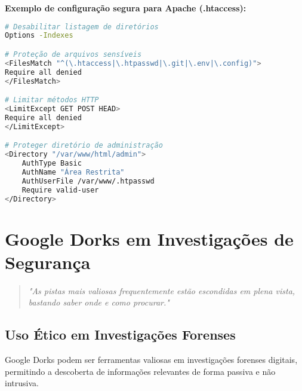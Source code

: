 \documentclass[12pt,a4paper]{book}
\begin{document}
\begin{examplebox}
\textbf{Exemplo de configuração segura para Apache (.htaccess):}

\begin{lstlisting}[language=bash]
# Desabilitar listagem de diretórios
Options -Indexes

# Proteção de arquivos sensíveis
<FilesMatch "^(\.htaccess|\.htpasswd|\.git|\.env|\.config)">
Require all denied
</FilesMatch>

# Limitar métodos HTTP
<LimitExcept GET POST HEAD>
Require all denied
</LimitExcept>

# Proteger diretório de administração
<Directory "/var/www/html/admin">
    AuthType Basic
    AuthName "Área Restrita"
    AuthUserFile /var/www/.htpasswd
    Require valid-user
</Directory>
\end{lstlisting}
\end{examplebox}

\chapter{Google Dorks em Investigações de Segurança}

\begin{quote}
\textit{"As pistas mais valiosas frequentemente estão escondidas em plena vista, bastando saber onde e como procurar."} \\
\end{quote}

\section{Uso Ético em Investigações Forenses}

Google Dorks podem ser ferramentas valiosas em investigações forenses digitais, permitindo a descoberta de informações relevantes de forma passiva e não intrusiva.
\end{document}
